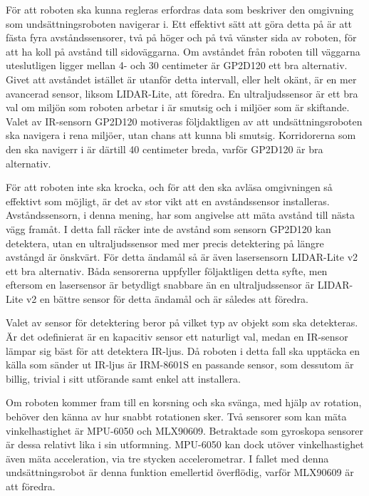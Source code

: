\documentclass[11pt]{article}
\begin{document}
\begin{flushleft}
För att roboten ska kunna regleras erfordras data som beskriver den omgivning som undsättningsroboten navigerar i. Ett effektivt sätt att göra detta på är att fästa fyra avståndssensorer, två på höger och på två vänster sida av roboten, för att ha koll på avstånd till sidoväggarna. Om avståndet från roboten till väggarna uteslutligen ligger mellan 4- och 30 centimeter är GP2D120 ett bra alternativ. Givet att avståndet istället är utanför detta intervall, eller helt okänt, är en mer avancerad sensor, liksom LIDAR-Lite, att föredra. En ultraljudssensor är ett bra val om miljön som roboten arbetar i är smutsig och i miljöer som är skiftande. Valet av IR-sensorn GP2D120 motiveras följdaktligen av att undsättningsroboten ska navigera i rena miljöer, utan chans att kunna bli smutsig. Korridorerna som den ska navigerr i är därtill 40 centimeter breda, varför GP2D120 är bra alternativ. 

För att roboten inte ska krocka, och för att den ska avläsa omgivningen så effektivt som möjligt, är det av stor vikt att en avståndssensor installeras. Avståndssensorn, i denna mening, har som angivelse att mäta avstånd till nästa vägg framåt. I detta fall räcker inte de avstånd som sensorn GP2D120 kan detektera, utan en ultraljudssensor med mer precis detektering på längre avstångd är önskvärt. För detta ändamål så är även lasersensorn LIDAR-Lite v2 ett bra alternativ. Båda sensorerna uppfyller följaktligen detta syfte, men eftersom en lasersensor är betydligt snabbare än en ultraljudssensor är LIDAR-Lite v2 en bättre sensor för detta ändamål och är således att föredra. 

Valet av sensor för detektering beror på vilket typ av objekt som ska detekteras. Är det odefinierat är en kapacitiv sensor ett naturligt val, medan en IR-sensor lämpar sig bäst för att detektera IR-ljus. Då roboten i detta fall ska upptäcka en källa som sänder ut IR-ljus är IRM-8601S en passande sensor, som dessutom är billig, trivial i sitt utförande samt enkel att installera.

Om roboten kommer fram till en korsning och ska svänga, med hjälp av rotation, behöver den känna av hur snabbt rotationen sker. Två sensorer som kan mäta vinkelhastighet är MPU-6050 och MLX90609. Betraktade som gyroskopa sensorer är dessa relativt lika i sin utformning. MPU-6050 kan dock utöver vinkelhastighet även mäta acceleration, via tre stycken accelerometrar. I fallet med denna undsättningsrobot är denna funktion emellertid överflödig, varför MLX90609 är att föredra. 


\pagebreak
{}




\pagebreak
\appendix

\end{flushleft}



\end{document}

